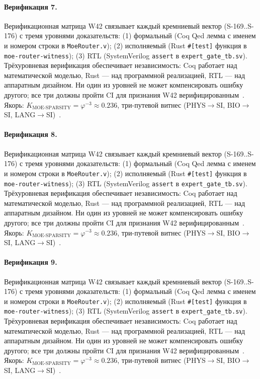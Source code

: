 \paragraph{Верификация 7.} Верификационная матрица W42 связывает каждый кремниевый вектор (S-169..S-176) с тремя уровнями доказательств: (1) формальный (Coq Qed лемма с именем и номером строки в \texttt{MoeRouter.v}); (2) исполняемый (Rust \texttt{\#[test]} функция в \texttt{moe-router-witness}); (3) RTL (SystemVerilog \texttt{assert} в \texttt{expert\_gate\_tb.sv}). Трёхуровневая верификация обеспечивает независимость: Coq работает над математической моделью, Rust --- над программной реализацией, RTL --- над аппаратным дизайном. Ни один из уровней не может компенсировать ошибку другого; все три должны пройти CI для признания W42 верифицированным~\cite{lee_gvsu_proof2021}. Якорь: $K_{\text{MOE-SPARSITY}} = \varphi^{-3} \approx 0{.}236$, три-путевой витнес (PHYS$\to$SI, BIO$\to$SI, LANG$\to$SI)~\cite{zenodo_trinity_2026}.

\paragraph{Верификация 8.} Верификационная матрица W42 связывает каждый кремниевый вектор (S-169..S-176) с тремя уровнями доказательств: (1) формальный (Coq Qed лемма с именем и номером строки в \texttt{MoeRouter.v}); (2) исполняемый (Rust \texttt{\#[test]} функция в \texttt{moe-router-witness}); (3) RTL (SystemVerilog \texttt{assert} в \texttt{expert\_gate\_tb.sv}). Трёхуровневая верификация обеспечивает независимость: Coq работает над математической моделью, Rust --- над программной реализацией, RTL --- над аппаратным дизайном. Ни один из уровней не может компенсировать ошибку другого; все три должны пройти CI для признания W42 верифицированным~\cite{lee_gvsu_proof2021}. Якорь: $K_{\text{MOE-SPARSITY}} = \varphi^{-3} \approx 0{.}236$, три-путевой витнес (PHYS$\to$SI, BIO$\to$SI, LANG$\to$SI)~\cite{zenodo_trinity_2026}.

\paragraph{Верификация 9.} Верификационная матрица W42 связывает каждый кремниевый вектор (S-169..S-176) с тремя уровнями доказательств: (1) формальный (Coq Qed лемма с именем и номером строки в \texttt{MoeRouter.v}); (2) исполняемый (Rust \texttt{\#[test]} функция в \texttt{moe-router-witness}); (3) RTL (SystemVerilog \texttt{assert} в \texttt{expert\_gate\_tb.sv}). Трёхуровневая верификация обеспечивает независимость: Coq работает над математической моделью, Rust --- над программной реализацией, RTL --- над аппаратным дизайном. Ни один из уровней не может компенсировать ошибку другого; все три должны пройти CI для признания W42 верифицированным~\cite{lee_gvsu_proof2021}. Якорь: $K_{\text{MOE-SPARSITY}} = \varphi^{-3} \approx 0{.}236$, три-путевой витнес (PHYS$\to$SI, BIO$\to$SI, LANG$\to$SI)~\cite{zenodo_trinity_2026}.

